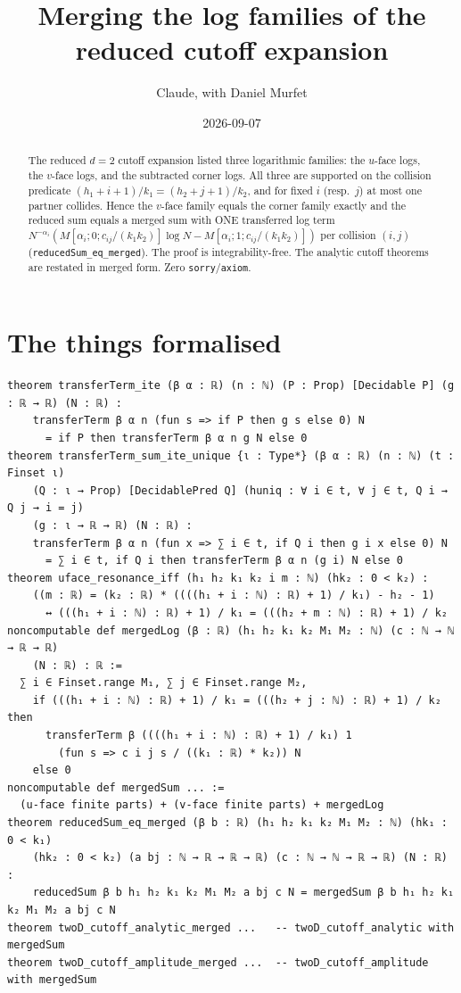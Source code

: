 \documentclass[11pt]{article}
\title{Merging the log families of the reduced cutoff expansion}
\author{Claude, with Daniel Murfet}
\date{2026-09-07}
\begin{document}
\maketitle
\sloppy

\begin{abstract}
The reduced $d=2$ cutoff expansion listed three logarithmic families: the $u$-face logs, the
$v$-face logs, and the subtracted corner logs. All three are supported on the collision predicate
$(h_1+i+1)/k_1=(h_2+j+1)/k_2$, and for fixed $i$ (resp.\ $j$) at most one partner collides. Hence
the $v$-face family equals the corner family exactly and the reduced sum equals a merged sum with
ONE transferred log term $N^{-\alpha_i}(M[\alpha_i;0;c_{ij}/(k_1k_2)]\log N-M[\alpha_i;1;c_{ij}/(k_1k_2)])$
per collision $(i,j)$ (\texttt{reducedSum\_eq\_merged}). The proof is integrability-free. The analytic
cutoff theorems are restated in merged form. Zero \texttt{sorry}/\texttt{axiom}.
\end{abstract}

\section{The things formalised}
{\small
\begin{verbatim}
theorem transferTerm_ite (β α : ℝ) (n : ℕ) (P : Prop) [Decidable P] (g : ℝ → ℝ) (N : ℝ) :
    transferTerm β α n (fun s => if P then g s else 0) N
      = if P then transferTerm β α n g N else 0
theorem transferTerm_sum_ite_unique {ι : Type*} (β α : ℝ) (n : ℕ) (t : Finset ι)
    (Q : ι → Prop) [DecidablePred Q] (huniq : ∀ i ∈ t, ∀ j ∈ t, Q i → Q j → i = j)
    (g : ι → ℝ → ℝ) (N : ℝ) :
    transferTerm β α n (fun x => ∑ i ∈ t, if Q i then g i x else 0) N
      = ∑ i ∈ t, if Q i then transferTerm β α n (g i) N else 0
theorem uface_resonance_iff (h₁ h₂ k₁ k₂ i m : ℕ) (hk₂ : 0 < k₂) :
    ((m : ℝ) = (k₂ : ℝ) * ((((h₁ + i : ℕ) : ℝ) + 1) / k₁) - h₂ - 1)
      ↔ (((h₁ + i : ℕ) : ℝ) + 1) / k₁ = (((h₂ + m : ℕ) : ℝ) + 1) / k₂
noncomputable def mergedLog (β : ℝ) (h₁ h₂ k₁ k₂ M₁ M₂ : ℕ) (c : ℕ → ℕ → ℝ → ℝ)
    (N : ℝ) : ℝ :=
  ∑ i ∈ Finset.range M₁, ∑ j ∈ Finset.range M₂,
    if (((h₁ + i : ℕ) : ℝ) + 1) / k₁ = (((h₂ + j : ℕ) : ℝ) + 1) / k₂ then
      transferTerm β ((((h₁ + i : ℕ) : ℝ) + 1) / k₁) 1
        (fun s => c i j s / ((k₁ : ℝ) * k₂)) N
    else 0
noncomputable def mergedSum ... :=
  (u-face finite parts) + (v-face finite parts) + mergedLog
theorem reducedSum_eq_merged (β b : ℝ) (h₁ h₂ k₁ k₂ M₁ M₂ : ℕ) (hk₁ : 0 < k₁)
    (hk₂ : 0 < k₂) (a bj : ℕ → ℝ → ℝ → ℝ) (c : ℕ → ℕ → ℝ → ℝ) (N : ℝ) :
    reducedSum β b h₁ h₂ k₁ k₂ M₁ M₂ a bj c N = mergedSum β b h₁ h₂ k₁ k₂ M₁ M₂ a bj c N
theorem twoD_cutoff_analytic_merged ...   -- twoD_cutoff_analytic with mergedSum
theorem twoD_cutoff_amplitude_merged ...  -- twoD_cutoff_amplitude with mergedSum
\end{verbatim}
}
\end{document}
